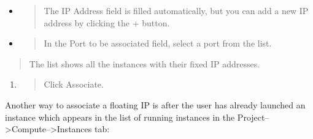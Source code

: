 {\begin{enumerate}
  \begin{itemize}
  \item
    \begin{quote}
    The IP Address field is filled automatically, but you can add a new
    IP address by clicking the + button.
    \end{quote}
  \item
    \begin{quote}
    In the Port to be associated field, select a port from the list.
    \end{quote}
  \end{itemize}
\end{enumerate}

\begin{quote}
The list shows all the instances with their fixed IP addresses.
\end{quote}

\begin{enumerate}
\def\labelenumi{\arabic{enumi}.}
\item
  \begin{quote}
  Click Associate.
  \end{quote}
\end{enumerate}


Another way to associate a floating IP is after the user has already launched an instance which appears in the list of running instances in the Project-->Compute-->Instances tab:

}
